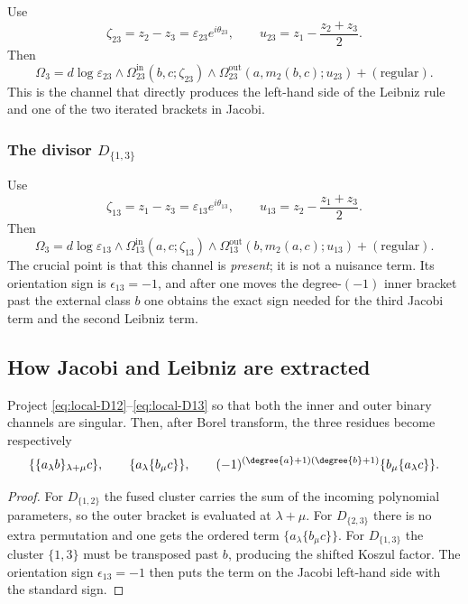 Use
\[
\zeta_{23}=z_2-z_3=\varepsilon_{23}e^{i\theta_{23}},
\qquad
u_{23}=z_1-\frac{z_2+z_3}{2}.
\]
Then
\begin{equation}
\label{eq:local-D23}
\Omega_3
=
d\log\varepsilon_{23}\wedge
\Omega_{23}^{\mathrm{in}}(b,c;\zeta_{23})
\wedge
\Omega_{23}^{\mathrm{out}}(a,m_2(b,c);u_{23})
+
(\text{regular}).
\end{equation}
This is the channel that directly produces the left-hand side of the Leibniz rule and
one of the two iterated brackets in Jacobi.

\subsubsection*{The divisor $D_{\{1,3\}}$}

Use
\[
\zeta_{13}=z_1-z_3=\varepsilon_{13}e^{i\theta_{13}},
\qquad
u_{13}=z_2-\frac{z_1+z_3}{2}.
\]
Then
\begin{equation}
\label{eq:local-D13}
\Omega_3
=
d\log\varepsilon_{13}\wedge
\Omega_{13}^{\mathrm{in}}(a,c;\zeta_{13})
\wedge
\Omega_{13}^{\mathrm{out}}(b,m_2(a,c);u_{13})
+
(\text{regular}).
\end{equation}
The crucial point is that this channel is \emph{present}; it is not a nuisance term.
Its orientation sign is $\epsilon_{13}=-1$, and after one moves the degree-$(-1)$
inner bracket past the external class $b$ one obtains the exact sign needed for the
third Jacobi term and the second Leibniz term.

\subsection{How Jacobi and Leibniz are extracted}

\begin{proposition}
\label{prop:ss-projection}
Project \eqref{eq:local-D12}--\eqref{eq:local-D13} so that both the inner and outer
binary channels are singular.  Then, after Borel transform, the three residues become
respectively
\[
\{\{a_\lambda b\}_{\lambda+\mu}c\},
\qquad
\{a_\lambda\{b_\mu c\}\},
\qquad
(-1)^{(\degree{a}+1)(\degree{b}+1)}\{b_\mu\{a_\lambda c\}\}.
\]
\end{proposition}

\begin{proof}
For $D_{\{1,2\}}$ the fused cluster carries the sum of the incoming polynomial
parameters, so the outer bracket is evaluated at $\lambda+\mu$.
For $D_{\{2,3\}}$ there is no extra permutation and one gets the ordered term
$\{a_\lambda\{b_\mu c\}\}$.
For $D_{\{1,3\}}$ the cluster $\{1,3\}$ must be transposed past $b$, producing the
shifted Koszul factor.  The orientation sign $\epsilon_{13}=-1$ then puts the term on
the Jacobi left-hand side with the standard sign.
\end{proof}

